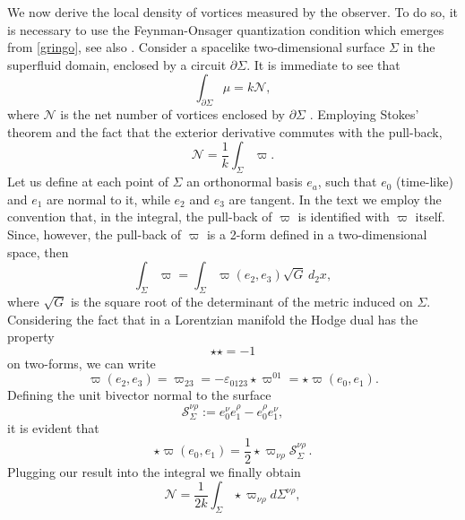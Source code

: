 \documentclass[usenatbib%
]{mnras}
\begin{document}
We now derive the local density of vortices measured by the observer. 
To do so, it is necessary to use the Feynman-Onsager quantization condition which emerges from \eqref{gringo}, see also \cite{antonelli+2018}. 
Consider a spacelike two-dimensional surface $\Sigma$ in the superfluid domain, enclosed by a circuit $\partial \Sigma$. It is immediate to see that
\begin{equation}\label{motta}
\int_{\partial \Sigma} \mu = k\mathcal{N} ,
\end{equation}
where $\mathcal{N}$ is the net number of vortices enclosed by $\partial \Sigma$ \citep{antonelli+2018}. 
Employing Stokes' theorem and the fact that the exterior derivative commutes with the pull-back,
\begin{equation}
\mathcal{N} = \dfrac{1}{k} \int_{\Sigma} \varpi.
\end{equation}
Let us define at each point of $\Sigma$ an orthonormal basis $e_a$, such that $e_0$ (time-like) and $e_1$ are normal to it, while $e_2$ and $e_3$ are tangent. In the text we employ the convention that, in the integral, the pull-back of $\varpi$ is identified with $\varpi$ itself. Since, however, the pull-back of $\varpi$ is a 2-form defined in a two-dimensional space, then 
\begin{equation}
\int_{\Sigma} \varpi= \int_{\Sigma} \varpi(e_2,e_3)\sqrt{G} \, d_2 x,
\end{equation}
where $\sqrt{G}$ is the square root of the determinant of the metric induced on $\Sigma$. 
Considering the fact that in a Lorentzian manifold the Hodge dual has the property
\begin{equation}
{\star}{\star} = -1
\end{equation}
on two-forms, we can write
\begin{equation}
\varpi (e_2,e_3) = \varpi_{23} = -\varepsilon_{0123} {\star}\varpi^{01} = {\star}\varpi(e_0,e_1).
\end{equation}
Defining the unit bivector normal to the surface
\begin{equation}
\mathcal{S}^{\nu \rho}_{\Sigma} := e_0^\nu e_1^\rho - e_0^\rho e_1^\nu,
\end{equation}
it is evident that
\begin{equation}
 {\star}\varpi(e_0,e_1) = \dfrac{1}{2} {\star}\varpi_{\nu \rho} \mathcal{S}^{\nu \rho}_{\Sigma} \, .
\end{equation}
Plugging our result into the integral we finally obtain
\begin{equation}
\mathcal{N} =\dfrac{1}{2k} \int_{\Sigma} {\star}\varpi_{\nu \rho} d\Sigma^{\nu \rho},
\end{equation}
\end{document}
